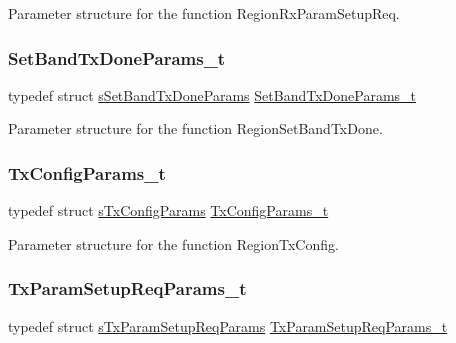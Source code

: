 Parameter structure for the function Region\+Rx\+Param\+Setup\+Req. \mbox{\label{group___r_e_g_i_o_n_gad0524aa0673c0814a71e7a4f9cade3fc}} 
\subsubsection{\texorpdfstring{Set\+Band\+Tx\+Done\+Params\+\_\+t}{SetBandTxDoneParams\_t}}
{\footnotesize\ttfamily typedef struct \mbox{\hyperlink{structs_set_band_tx_done_params}{s\+Set\+Band\+Tx\+Done\+Params}} \mbox{\hyperlink{group___r_e_g_i_o_n_gad0524aa0673c0814a71e7a4f9cade3fc}{Set\+Band\+Tx\+Done\+Params\+\_\+t}}}

Parameter structure for the function Region\+Set\+Band\+Tx\+Done. \mbox{\label{group___r_e_g_i_o_n_gabed730d4d04b0b60d4b6d1966d3f21d3}} 
\subsubsection{\texorpdfstring{Tx\+Config\+Params\+\_\+t}{TxConfigParams\_t}}
{\footnotesize\ttfamily typedef struct \mbox{\hyperlink{structs_tx_config_params}{s\+Tx\+Config\+Params}} \mbox{\hyperlink{group___r_e_g_i_o_n_gabed730d4d04b0b60d4b6d1966d3f21d3}{Tx\+Config\+Params\+\_\+t}}}

Parameter structure for the function Region\+Tx\+Config. \mbox{\label{group___r_e_g_i_o_n_ga26836ef2996e70410e42ef471073f855}} 
\subsubsection{\texorpdfstring{Tx\+Param\+Setup\+Req\+Params\+\_\+t}{TxParamSetupReqParams\_t}}
{\footnotesize\ttfamily typedef struct \mbox{\hyperlink{structs_tx_param_setup_req_params}{s\+Tx\+Param\+Setup\+Req\+Params}} \mbox{\hyperlink{group___r_e_g_i_o_n_ga26836ef2996e70410e42ef471073f855}{Tx\+Param\+Setup\+Req\+Params\+\_\+t}}}

